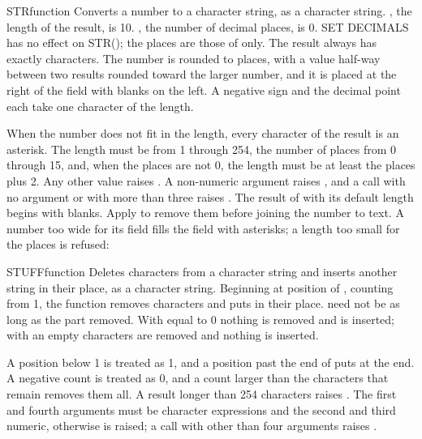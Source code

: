 \begin{XbaseEntry}{STR}{function}
Converts a number to a character string, as a character string.
\Syntax
{}
\Defaults
{}, the length of the result, is 10. , the number of decimal places, is 0. SET DECIMALS has no effect on STR(); the places are those of  only.
\Usage
The result always has exactly  characters. The number is rounded to  places, with a value half-way between two results rounded toward the larger number, and it is placed at the right of the field with blanks on the left. A negative sign and the decimal point each take one character of the length.

When the number does not fit in the length, every character of the result is an asterisk. The length must be from 1 through 254, the number of places from 0 through 15, and, when the places are not 0, the length must be at least the places plus 2. Any other value raises . A non-numeric argument raises , and a call with no argument or with more than three raises .
\Tips
The result of  with its default length begins with blanks. Apply  to remove them before joining the number to text.
\Examples
{}
A number too wide for its field fills the field with asterisks; a length too small for the places is refused:
\end{XbaseEntry}

\begin{XbaseEntry}{STUFF}{function}
Deletes characters from a character string and inserts another string in their place, as a character string.
\Syntax
{}
\Usage
Beginning at position  of , counting from 1, the function removes  characters and puts  in their place.  need not be as long as the part removed. With  equal to 0 nothing is removed and  is inserted; with an empty  characters are removed and nothing is inserted.

A position below 1 is treated as 1, and a position past the end of  puts  at the end. A negative count is treated as 0, and a count larger than the characters that remain removes them all. A result longer than 254 characters raises . The first and fourth arguments must be character expressions and the second and third numeric, otherwise  is raised; a call with other than four arguments raises .
\Examples
{}
\end{XbaseEntry}

